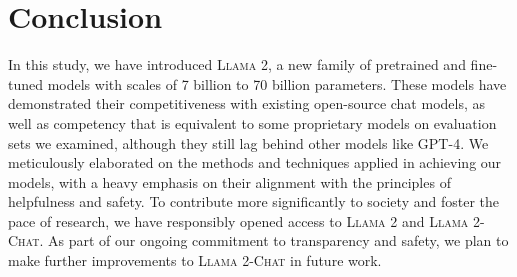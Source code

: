 \section{Conclusion}
\label{sec:conclusion}
In this study, we have introduced \textsc{Llama 2}, a new family of pretrained and fine-tuned models with scales of 7 billion to 70 billion parameters. These models have demonstrated their competitiveness with existing open-source chat models, as well as competency that is equivalent to some proprietary models on evaluation sets we examined, although they still lag behind other models like GPT-4. We meticulously elaborated on the methods and techniques applied in achieving our models, with a heavy emphasis on their alignment with the principles of helpfulness and safety. To contribute more significantly to society and foster the pace of research, we have responsibly opened access to \textsc{Llama 2} and \textsc{Llama 2-Chat}. As part of our ongoing commitment to transparency and safety, we plan to make further improvements to \textsc{Llama 2-Chat} in future work.


